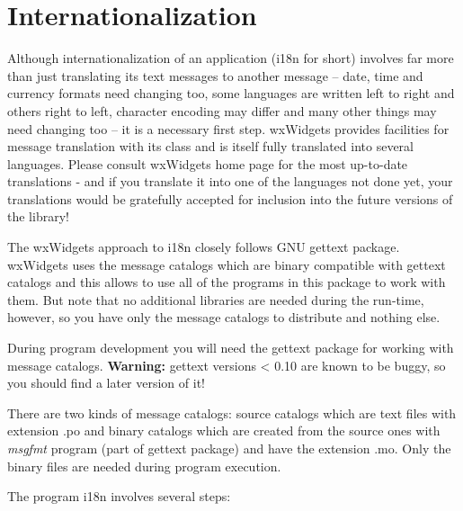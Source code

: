 \section{Internationalization}\label{internationalization}

Although internationalization of an application (i18n for short) involves far
more than just translating its text messages to another message -- date, time and
currency formats need changing too, some languages are written left to right
and others right to left, character encoding may differ and many other things
may need changing too -- it is a necessary first step. wxWidgets provides
facilities for message translation with its 
 class and is itself fully translated into several
languages. Please consult wxWidgets home page for the most up-to-date
translations - and if you translate it into one of the languages not done
yet, your translations would be gratefully accepted for inclusion into the
future versions of the library!

The wxWidgets approach to i18n closely follows GNU gettext package. wxWidgets uses the
message catalogs which are binary compatible with gettext catalogs and this
allows to use all of the programs in this package to work with them. But note
that no additional libraries are needed during the run-time, however, so you
have only the message catalogs to distribute and nothing else.

During program development you will need the gettext package for
working with message catalogs. {\bf Warning:} gettext versions < 0.10 are known
to be buggy, so you should find a later version of it!

There are two kinds of message catalogs: source catalogs which are text files
with extension .po and binary catalogs which are created from the source ones
with {\it msgfmt} program (part of gettext package) and have the extension .mo.
Only the binary files are needed during program execution.

The program i18n involves several steps:

